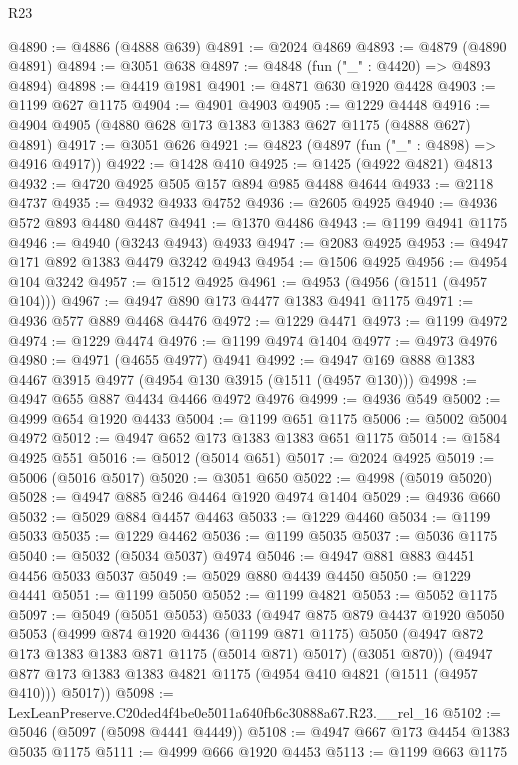 \begin{lexlean}{R23}
\begin{coremodule}
@4890 := @4886 (@4888 @639)
@4891 := @2024 @4869
@4893 := @4879 (@4890 @4891)
@4894 := @3051 @638
@4897 := @4848 (fun ("_" : @4420) => @4893 @4894)
@4898 := @4419 @1981
@4901 := @4871 @630 @1920 @4428
@4903 := @1199 @627 @1175
@4904 := @4901 @4903
@4905 := @1229 @4448
@4916 := @4904 @4905 (@4880 @628 @173 @1383 @1383 @627 @1175 (@4888 @627) @4891)
@4917 := @3051 @626
@4921 := @4823 (@4897 (fun ("_" : @4898) => @4916 @4917))
@4922 := @1428 @410
@4925 := @1425 (@4922 @4821) @4813
@4932 := @4720 @4925 @505 @157 @894 @985 @4488 @4644
@4933 := @2118 @4737
@4935 := @4932 @4933 @4752
@4936 := @2605 @4925
@4940 := @4936 @572 @893 @4480 @4487
@4941 := @1370 @4486
@4943 := @1199 @4941 @1175
@4946 := @4940 (@3243 @4943) @4933
@4947 := @2083 @4925
@4953 := @4947 @171 @892 @1383 @4479 @3242 @4943
@4954 := @1506 @4925
@4956 := @4954 @104 @3242
@4957 := @1512 @4925
@4961 := @4953 (@4956 (@1511 (@4957 @104)))
@4967 := @4947 @890 @173 @4477 @1383 @4941 @1175
@4971 := @4936 @577 @889 @4468 @4476
@4972 := @1229 @4471
@4973 := @1199 @4972
@4974 := @1229 @4474
@4976 := @1199 @4974 @1404
@4977 := @4973 @4976
@4980 := @4971 (@4655 @4977) @4941
@4992 := @4947 @169 @888 @1383 @4467 @3915 @4977 (@4954 @130 @3915 (@1511 (@4957 @130)))
@4998 := @4947 @655 @887 @4434 @4466 @4972 @4976
@4999 := @4936 @549
@5002 := @4999 @654 @1920 @4433
@5004 := @1199 @651 @1175
@5006 := @5002 @5004 @4972
@5012 := @4947 @652 @173 @1383 @1383 @651 @1175
@5014 := @1584 @4925 @551
@5016 := @5012 (@5014 @651)
@5017 := @2024 @4925
@5019 := @5006 (@5016 @5017)
@5020 := @3051 @650
@5022 := @4998 (@5019 @5020)
@5028 := @4947 @885 @246 @4464 @1920 @4974 @1404
@5029 := @4936 @660
@5032 := @5029 @884 @4457 @4463
@5033 := @1229 @4460
@5034 := @1199 @5033
@5035 := @1229 @4462
@5036 := @1199 @5035
@5037 := @5036 @1175
@5040 := @5032 (@5034 @5037) @4974
@5046 := @4947 @881 @883 @4451 @4456 @5033 @5037
@5049 := @5029 @880 @4439 @4450
@5050 := @1229 @4441
@5051 := @1199 @5050
@5052 := @1199 @4821
@5053 := @5052 @1175
@5097 := @5049
    (@5051 @5053)
    @5033
    (@4947
      @875
      @879
      @4437
      @1920
      @5050
      @5053
      (@4999
        @874
        @1920
        @4436
        (@1199 @871 @1175)
        @5050
        (@4947 @872 @173 @1383 @1383 @871 @1175 (@5014 @871) @5017)
        (@3051 @870))
      (@4947 @877 @173 @1383 @1383 @4821 @1175 (@4954 @410 @4821 (@1511 (@4957 @410))) @5017))
@5098 := LexLeanPreserve.C20ded4f4be0e5011a640fb6c30888a67.R23.__rel_16
@5102 := @5046 (@5097 (@5098 @4441 @4449))
@5108 := @4947 @667 @173 @4454 @1383 @5035 @1175
@5111 := @4999 @666 @1920 @4453
@5113 := @1199 @663 @1175

\end{coremodule}
\end{lexlean}
